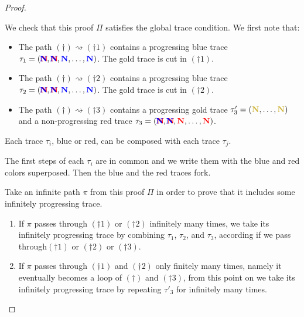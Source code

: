 \begin{proof}
\begin{flushright}
\end{flushright}

\vspace{1cm}

We check that this proof $\Pi$ satisfies the global trace condition.
We first note that:

\begin{itemize}
\item
  The path $(\dagger)\rightsquigarrow(\dagger1)$ contains a progressing blue trace $\tau_1 = ({{\bf \color{red}{N}}\hspace{-1em}{\bf \color{blue}{N}}},{{\bf \color{red}{N}}\hspace{-1em}{\bf \color{blue}{N}}},{{\bf \color{blue}{N}}},\ldots,{{\bf \color{blue}{N}}})$. The gold trace is cut in $(\dagger1)$.
\item
  The path $(\dagger)\rightsquigarrow(\dagger2)$ contains a progressing blue trace $\tau_2 = ({{\bf \color{red}{N}}\hspace{-1em}{\bf \color{blue}{N}}},{{\bf \color{red}{N}}\hspace{-1em}{\bf \color{blue}{N}}},{{\bf \color{blue}{N}}},\ldots,{{\bf \color{blue}{N}}})$. The gold trace is cut in $(\dagger2)$.
\item
  The path $(\dagger)\rightsquigarrow(\dagger3)$ contains a progressing gold trace 
$\tau'_3 = (\goldN,\ldots,\goldN)$ and a non-progressing red trace 
$\tau_3 = ({{\bf \color{red}{N}}\hspace{-1em}{\bf \color{blue}{N}}},{{\bf \color{red}{N}}\hspace{-1em}{\bf \color{blue}{N}}},{{\bf \color{red}{N}}},\ldots,{{\bf \color{red}{N}}})$. 
\end{itemize}

Each trace $\tau_i$, blue or red, can be composed with each trace $\tau_j$. 

The first steps of each $\tau_i$ are in common and we write them with the blue and red colors superposed.
Then the blue and the red traces fork.

Take an infinite path $\pi$ from this proof $\Pi$ 
in order to prove that it includes some infinitely progressing trace.

\begin{enumerate}
\item
If $\pi$ passes through $(\dagger1)$ or $(\dagger2)$ infinitely many times,
we take its infinitely progressing trace by combining $\tau_1$, $\tau_2$, and $\tau_3$,
according if we pass through$(\dagger1)$ or $(\dagger2)$ or $(\dagger3)$. 

\item
If $\pi$ passes through $(\dagger1)$ and $(\dagger2)$ only finitely many times,
namely it eventually becomes a loop of $(\dagger)$ and $(\dagger3)$,
from this point on we take its infinitely progressing trace by repeating $\tau'_3$ for infinitely many times.
\end{enumerate}

\end{proof}



  
%
%
%
